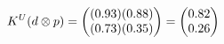 \documentclass[preview]{standalone}
\begin{document}
\begin{align*}
\special{dvisvgm:raw <g id='unique000'>}K^U(d \otimes p) = \begin{pmatrix} (0.93)(0.88) \\ (0.73)(0.35) \end{pmatrix} = \begin{pmatrix} 0.82 \\ 0.26 \end{pmatrix}\special{dvisvgm:raw </g>}
\end{align*}
\end{document}
